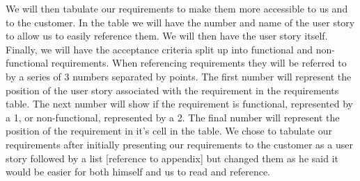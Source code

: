 We will then tabulate our requirements to make them more accessible to us and to the customer.
In the table we will have the number and name of the user story to allow us to easily reference them.
We will then have the user story itself.
Finally, we will have the acceptance criteria split up into functional and non-functional requirements.
When referencing requirements they will be referred to by a series of 3 numbers separated by points.
The first number will represent the position of the user story associated with the requirement in the requirements table.
The next number will show if the requirement is functional, represented by a 1, or non-functional, represented by a  2.
The final number will represent the position of the requirement in it’s cell in the table.
We chose to tabulate our requirements after initially presenting our requirements to the customer as a user story followed by a list [reference to appendix] but changed them as he said it would be easier for both himself and us to read and reference.



\restoregeometry


